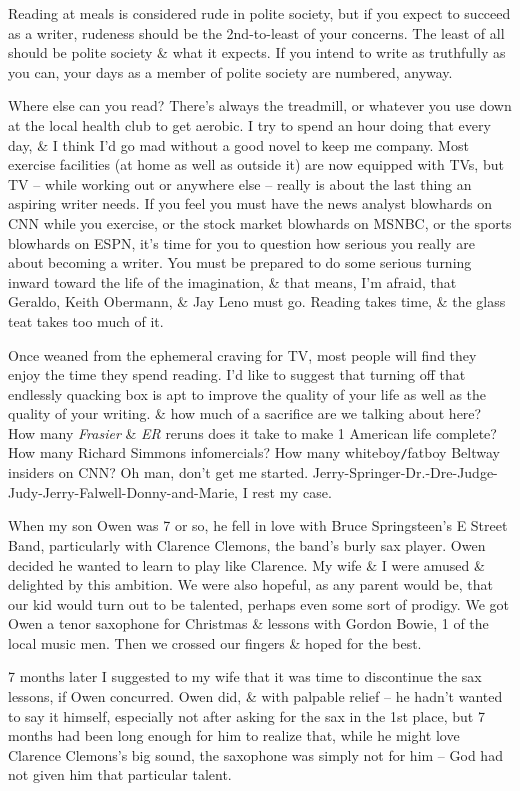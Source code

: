 \documentclass{article}
\numberwithin{equation}{section}
\begin{document}
Reading at meals is considered rude in polite society, but if you expect to succeed as a writer, rudeness should be the 2nd-to-least of your concerns. The least of all should be polite society \& what it expects. If you intend to write as truthfully as you can, your days as a member of polite society are numbered, anyway.

Where else can you read? There's always the treadmill, or whatever you use down at the local health club to get aerobic. I try to spend an hour doing that every day, \& I think I'd go mad without a good novel to keep me company. Most exercise facilities (at home as well as outside it) are now equipped with TVs, but TV -- while working out or anywhere else -- really is about the last thing an aspiring writer needs. If you feel you must have the news analyst blowhards on CNN while you exercise, or the stock market blowhards on MSNBC, or the sports blowhards on ESPN, it's time for you to question how serious you really are about becoming a writer. You must be prepared to do some serious turning inward toward the life of the imagination, \& that means, I'm afraid, that Geraldo, Keith Obermann, \& Jay Leno must go. Reading takes time, \& the glass teat takes too much of it.

Once weaned from the ephemeral craving for TV, most people will find they enjoy the time they spend reading. I'd like to suggest that turning off that endlessly quacking box is apt to improve the quality of your life as well as the quality of your writing. \& how much of a sacrifice are we talking about here? How many \textit{Frasier} \& \textit{ER} reruns does it take to make 1 American life complete? How many Richard Simmons infomercials? How many whiteboy{\tt/}fatboy Beltway insiders on CNN? Oh man, don't get me started. Jerry-Springer-Dr.-Dre-Judge-Judy-Jerry-Falwell-Donny-and-Marie, I rest my case.

When my son Owen was 7 or so, he fell in love with Bruce Springsteen's E Street Band, particularly with Clarence Clemons, the band's burly sax player. Owen decided he wanted to learn to play like Clarence. My wife \& I were amused \& delighted by this ambition. We were also hopeful, as any parent would be, that our kid would turn out to be talented, perhaps even some sort of prodigy. We got Owen a tenor saxophone for Christmas \& lessons with Gordon Bowie, 1 of the local music men. Then we crossed our fingers \& hoped for the best.

7 months later I suggested to my wife that it was time to discontinue the sax lessons, if Owen concurred. Owen did, \& with palpable relief -- he hadn't wanted to say it himself, especially not after asking for the sax in the 1st place, but 7 months had been long enough for him to realize that, while he might love Clarence Clemons's big sound, the saxophone was simply not for him -- God had not given him that particular talent.
\end{document}
